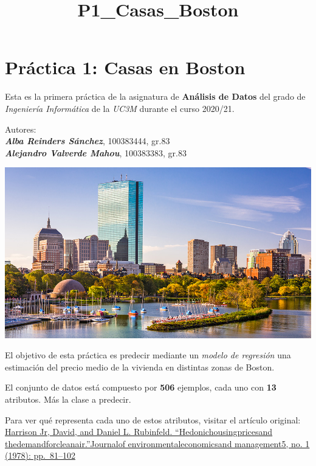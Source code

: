 \documentclass[11pt]{article}
\title{P1\_Casas\_Boston}
\begin{document}
    \maketitle




    \hypertarget{pruxe1ctica-1-casas-en-boston}{%
\section{Práctica 1: Casas en
Boston}\label{pruxe1ctica-1-casas-en-boston}}

Esta es la primera práctica de la asignatura de \textbf{Análisis de
Datos} del grado de \emph{Ingeniería Informática} de la \emph{UC3M}
durante el curso 2020/21.

Autores:\\
\textbf{\emph{Alba Reinders Sánchez}}, 100383444, gr.83\\
\textbf{\emph{Alejandro Valverde Mahou}}, 100383383, gr.83

    \includegraphics{./imagen_boston.jpg}

    El objetivo de esta práctica es predecir mediante un \emph{modelo de
regresión} una estimación del precio medio de la vivienda en distintas
zonas de Boston.

El conjunto de datos está compuesto por \textbf{506} ejemplos, cada uno
con \textbf{13} atributos. Más la clase a predecir.

Para ver qué representa cada uno de estos atributos, visitar el artículo
original:
\href{https://www.researchgate.net/publication/4974606_Hedonic_housing_prices_and_the_demand_for_clean_air}{Harrison
Jr, David, and Daniel L. Rubinfeld. ``Hedonichousingpricesand
thedemandforcleanair.''Journalof environmentaleconomicsand management5,
no. 1 (1978): pp.~81--102}
\end{document}
